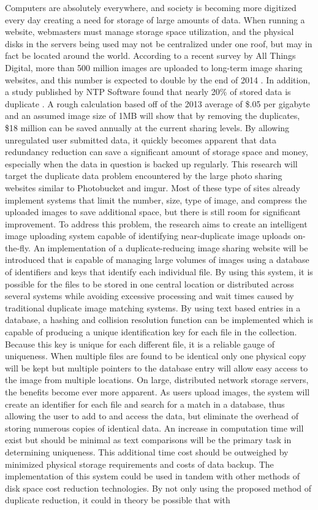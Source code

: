 \documentclass[11pt]{article}
\begin{document}
Computers are absolutely everywhere, and society is becoming more digitized every day creating a need for storage of large amounts of data. When running a website, webmasters must manage storage space utilization, and the physical disks in the servers being used may not be centralized under one roof, but may in fact be located around the world. According to a recent survey by All Things Digital, more than 500 million images are uploaded to long-term image sharing websites, and this number is expected to double by the end of 2014 \cite{meek:500}. In addition, a study published by NTP Software found that nearly 20\% of stored data is duplicate \cite{ntps:staledata}. A rough calculation based off of the 2013 average of \$.05 per gigabyte and an assumed image size of 1MB will show that by removing the duplicates, \$18 million can be saved annually at the current sharing levels. By allowing unregulated user submitted data, it quickly becomes apparent that data redundancy reduction can save a significant amount of storage space and money, especially when the data in question is backed up regularly. This research will target the duplicate data problem encountered by the large photo sharing websites similar to Photobucket and imgur. Most of these type of sites already implement systems that limit the number, size, type of image, and compress the uploaded images to save additional space, but there is still room for significant improvement. To address this problem, the research aims to create an intelligent image uploading system capable of identifying near-duplicate image uploads on-the-fly. An implementation of a duplicate-reducing image sharing website will be introduced that is capable of managing large volumes of images using a database of identifiers and keys that identify each individual file. By using this system, it is possible for the files to be stored in one central location or distributed across several systems while avoiding excessive processing and wait times caused by traditional duplicate image matching systems. By using text based entries in a database, a hashing and collision resolution function can be implemented which is capable of producing a unique identification key for each file in the collection. Because this key is unique for each different file, it is a reliable gauge of uniqueness. When multiple files are found to be identical only one physical copy will be kept but multiple pointers to the database entry will allow easy access to the image from multiple locations. On large, distributed network storage servers, the benefits become ever more apparent. As users upload images, the system will create an identifier for each file and search for a match in a database, thus allowing the user to add to and access the data, but eliminate the overhead of storing numerous copies of identical data. An increase in computation time will exist but should be minimal as text comparisons will be the primary task in determining uniqueness. This additional time cost should be outweighed by minimized physical storage requirements and costs of data backup. The implementation of this system could be used in tandem with other methods of disk space cost reduction technologies. By not only using the proposed method of duplicate reduction, it could in theory be possible that with 
\end{document}
